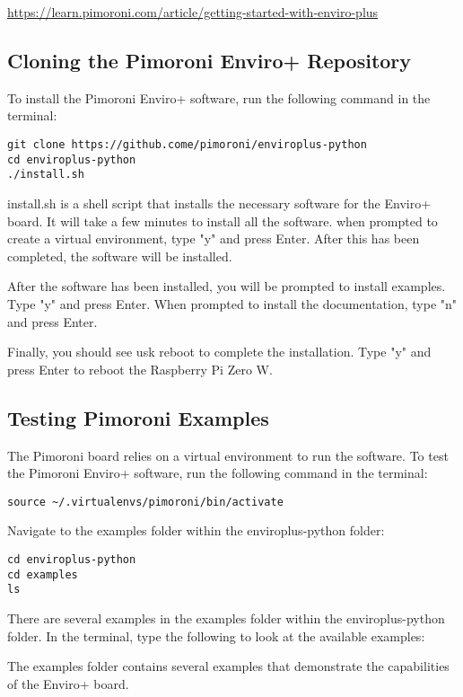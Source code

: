\documentclass{article}
\begin{document}
\url{https://learn.pimoroni.com/article/getting-started-with-enviro-plus}

\subsection{Cloning the Pimoroni Enviro+ Repository}

To install the Pimoroni Enviro+ software, run the following command in the terminal:

\begin{verbatim}
git clone https://github.come/pimoroni/enviroplus-python
cd enviroplus-python
./install.sh
\end{verbatim}

install.sh is a shell script that installs the necessary software for the Enviro+ board. It will take a few minutes to install all the software. when prompted to create a virtual environment, type "y" and press Enter. After this has been completed, the software will be installed. 

After the software has been installed, you will be prompted to install examples. Type "y" and press Enter.
When prompted to install the documentation, type "n" and press Enter. 

Finally, you should see usk reboot to complete the installation. Type "y" and press Enter to reboot the Raspberry Pi Zero W.

\subsection{Testing Pimoroni Examples}

The Pimoroni board relies on a virtual environment to run the software. To test the Pimoroni Enviro+ software, run the following command in the terminal:

\begin{verbatim}
source ~/.virtualenvs/pimoroni/bin/activate
\end{verbatim}

Navigate to the examples folder within the enviroplus-python folder:

\begin{verbatim}
cd enviroplus-python
cd examples
ls
\end{verbatim}

There are several examples in the examples folder within the enviroplus-python folder. In the terminal, type the following to look at the available examples:

The examples folder contains several examples that demonstrate the capabilities of the Enviro+ board.
\end{document}
